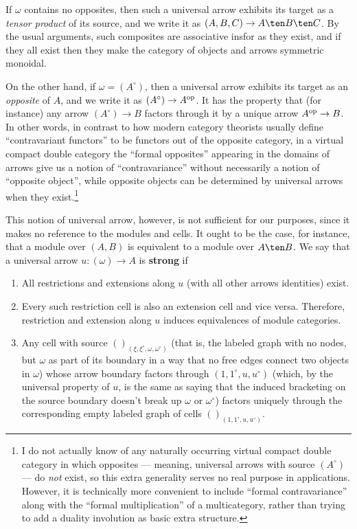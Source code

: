 \documentclass{amsart}
\def\emptyvec#1{()_{#1}}
\renewcommand{\o}{^{\circ}}
\begin{document}
If $\omega$ contains no opposites, then such a universal arrow exhibits its target as a \emph{tensor product} of its source, and we write it as $(A,B,C) \to A\ten B\ten C$.
By the usual arguments, such composites are associative insfor as they exist, and if they all exist then they make the category of objects and arrows symmetric monoidal.

On the other hand, if $\omega = (A\o)$, then a universal arrow exhibits its target as an \emph{opposite} of $A$, and we write it as $(A\o) \to A\op$.
It has the property that (for instance) any arrow $(A\o) \to B$ factors through it by a unique arrow $A^{\mathrm{op}} \to B$.
In other words, in contrast to how modern category theorists usually define ``contravariant functors'' to be functors out of the opposite category, in a virtual compact double category the ``formal opposites'' appearing in the domains of arrows give us a notion of ``contravariance'' without necessarily a notion of ``opposite object'', while opposite objects can be determined by universal arrows when they exist.\footnote{I do not actually know of any naturally occurring virtual compact double category in which opposites --- meaning, universal arrows with source $(A\o)$ --- do \emph{not} exist, so this extra generality serves no real purpose in applications.
However, it is technically more convenient to include ``formal contravariance'' along with the ``formal multiplication'' of a multicategory, rather than trying to add a duality involution as basic extra structure.}

This notion of universal arrow, however, is not sufficient for our purposes, since it makes no reference to the modules and cells.
It ought to be the case, for instance, that a module over $(A,B)$ is equivalent to a module over $A\ten B$.
We say that a universal arrow $u:(\omega) \to A$ is \textbf{strong} if
\begin{enumerate}
\item All restrictions and extensions along $u$ (with all other arrows identities) exist.
\item Every such restriction cell is also an extension cell and vice versa.
  Therefore, restriction and extension along $u$ induces equivalences of module categories.
\item Any cell with source $\emptyvec{(\xi,\xi\o,\omega,\omega\o)}$ (that is, the labeled graph with no nodes, but $\omega$ as part of its boundary in a way that no free edges connect two objects in $\omega$) whose arrow boundary factors through $(1,1\o,u,u\o)$ (which, by the universal property of $u$, is the same as saying that the induced bracketing on the source boundary doesn't break up $\omega$ or $\omega\o$) factors uniquely through the corresponding empty labeled graph of cells $\emptyvec{(1,1\o,u,u\o)}$.
\end{enumerate}
\end{document}
